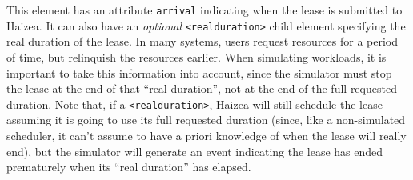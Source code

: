 This element has an attribute \texttt{arrival} indicating when the lease is submitted to Haizea. It can also have an \emph{optional} \texttt{<realduration>} child element specifying the real duration of the lease. In many systems, users request resources for a period of time, but relinquish the resources earlier. When simulating workloads, it is important to take this information into account, since the simulator must stop the lease at the end of that ``real duration'', not at the end of the full requested duration. Note that, if a \texttt{<realduration>}, Haizea will still schedule the lease assuming it is going to use its full requested duration (since, like a non-simulated scheduler, it can't assume to have a priori knowledge of when the lease will really end), but the simulator will generate an event indicating the lease has ended prematurely when its ``real duration'' has elapsed.

